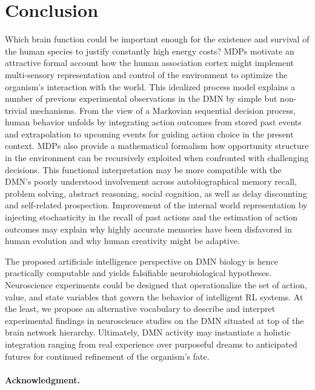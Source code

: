\documentclass[10pt,letterpaper]{article}
\begin{document}
\section{Conclusion}
Which brain function could be important enough
for the existence and survival of the human species
to justify constantly high energy costs?
MDPs motivate an attractive
formal account how the human association cortex
might implement multi-sensory representation and control of the environment to
optimize the organism's interaction with the world.
This idealized process model explains
a number of previous experimental observations in the
DMN by simple but non-trivial mechanisms.
%
From the view of a Markovian sequential decision process,
human behavior unfolds by integrating action outcomes from stored past events
and extrapolation to
upcoming events for guiding action choice in the present context.
MDPs also provide a mathematical formalism how
opportunity structure in the environment can be recursively exploited
when confronted with challenging decisions.
%
This functional interpretation may be more compatible with the DMN's
poorly understood involvement across
autobiographical memory recall, problem solving,
abstract reasoning, social cognition,
as well as delay discounting and self-related prospection.
Improvement of the internal world representation
by injecting stochasticity in the recall of past
actions and the estimation of action outcomes may explain why
highly accurate memories have been disfavored in human evolution
and why human creativity might be adaptive.



The proposed artificiale intelligence perspective
on DMN biology is hence practically computable and
yields falsifiable neurobiological hypotheses.
%
Neuroscience experiments could be designed that operationalize
the set of action, value, and state variables that govern
the behavior of intelligent RL systems.
%
At the least, we propose an alternative vocabulary to
describe and interpret experimental findings in neuroscience studies
on the DMN situated at top of the brain network hierarchy.
%
Ultimately,
DMN activity may instantiate a holistic integration
ranging from real experience over purposeful dreams to anticipated futures
for continued refinement of the organism's fate.



\paragraph{Acknowledgment.}
\end{document}
